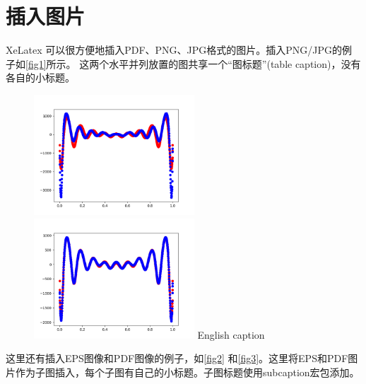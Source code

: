 \section{插入图片}

XeLatex 可以很方便地插入PDF、PNG、JPG格式的图片。插入PNG/JPG的例子如\autoref{fig1}所示。
这两个水平并列放置的图共享一个“图标题”(table caption)，没有各自的小标题。

\begin{figure}[htp]
	\centering
	\includegraphics[width=6cm]{figure/example/model1_1000.png}
	\hspace{1cm}
	\includegraphics[width=6cm]{figure/example/model1_10000.png}
	{English caption}
	\label{fig1}
\end{figure}

这里还有插入EPS图像和PDF图像的例子，如\autoref{fig2} 和\autoref{fig3}。这里将EPS和PDF图片作为子图插入，每个子图有自己的小标题。子图标题使用subcaption宏包添加。

